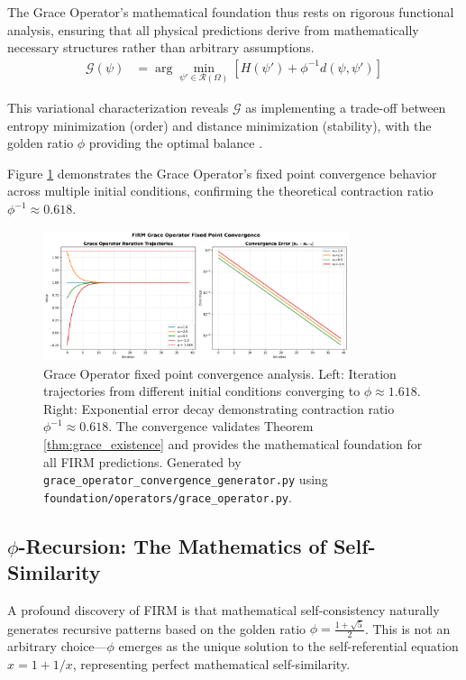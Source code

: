 \documentclass[12pt]{article}
\newcommand{\G}{\mathcal{G}}                %
\newcommand{\R}{\mathcal{R}}                %
\begin{document}
The Grace Operator's mathematical foundation thus rests on rigorous functional analysis, ensuring that all physical predictions derive from mathematically necessary structures rather than arbitrary assumptions.
\begin{align}
\G(\psi) &= \arg\min_{\psi' \in \R(\Omega)} \left[ H(\psi') + \phi^{-1} d(\psi, \psi') \right]
\end{align}

This variational characterization reveals $\G$ as implementing a trade-off between entropy minimization (order) and distance minimization (stability), with the golden ratio $\phi$ providing the optimal balance \citep{Shannon1948, Conway1996}.

Figure \ref{fig:grace_convergence} demonstrates the Grace Operator's fixed point convergence behavior across multiple initial conditions, confirming the theoretical contraction ratio $\phi^{-1} \approx 0.618$.

\begin{figure}[H]
    \centering
    \includegraphics[width=0.8\textwidth]{figures/outputs/grace_operator_fixed_point_convergence.png}
    \caption{Grace Operator fixed point convergence analysis. Left: Iteration trajectories from different initial conditions converging to $\phi \approx 1.618$. Right: Exponential error decay demonstrating contraction ratio $\phi^{-1} \approx 0.618$. The convergence validates Theorem \ref{thm:grace_existence} and provides the mathematical foundation for all FIRM predictions. Generated by \texttt{grace\_operator\_convergence\_generator.py} using \texttt{foundation/operators/grace\_operator.py}.}
    \label{fig:grace_convergence}
\end{figure}

\subsection{$\phi$-Recursion: The Mathematics of Self-Similarity}

A profound discovery of FIRM is that mathematical self-consistency naturally generates recursive patterns based on the golden ratio $\phi = \frac{1+\sqrt{5}}{2}$. This is not an arbitrary choice—$\phi$ emerges as the unique solution to the self-referential equation $x = 1 + 1/x$, representing perfect mathematical self-similarity.
\end{document}
